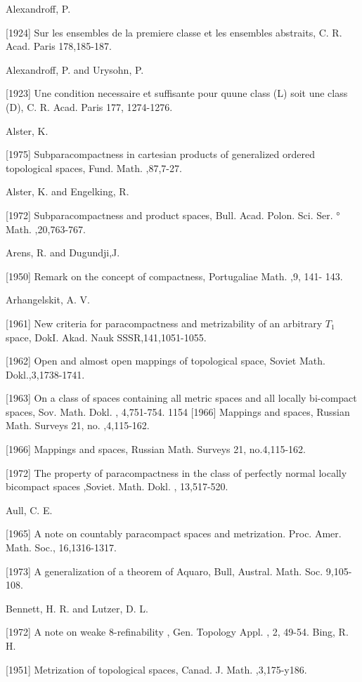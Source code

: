 \documentclass[main.tex]{subfiles}
\begin{document}
\noindent Alexandroff, P.

[1924] Sur les ensembles de la premiere classe et les ensembles abstraits, C.
R. Acad. Paris 178,185-187.

\noindent Alexandroff, P. and Urysohn, P.

[1923] Une condition necessaire et suffisante pour quune class (L) soit une class (D), C. R. Acad. Paris 177, 1274-1276.

\noindent Alster, K.

[1975] Subparacompactness in cartesian products of generalized ordered topological spaces, Fund. Math. ,87,7-27.

\noindent Alster, K. and Engelking, R.

[1972] Subparacompactness and product spaces, Bull. Acad. Polon. Sci. Ser.
° Math. ,20,763-767.

\noindent Arens, R. and Dugundji,J.

[1950] Remark on the concept of compactness, Portugaliae Math. ,9, 141- 143.

\noindent Arhangelskit, A. V.

[1961] New criteria for paracompactness and metrizability of an arbitrary $T_1$ space, DokI. Akad. Nauk SSSR,141,1051-1055.

[1962] Open and almost open mappings of topological space, Soviet Math. Dokl.,3,1738-1741.

[1963] On a class of spaces containing all metric spaces and all locally bi-compact spaces, Sov. Math. Dokl. , 4,751-754. 1154
[1966] Mappings and spaces, Russian Math. Surveys 21, no. ,4,115-162.

[1966] Mappings and spaces, Russian Math. Surveys 21, no.4,115-162.
	
[1972] The property of paracompactness in the class of perfectly normal locally bicompact spaces ,Soviet. Math. Dokl. , 13,517-520.

\noindent Aull, C. E.

[1965]
A note on countably paracompact spaces and metrization. Proc.
Amer. Math. Soc., 16,1316-1317.

[1973]
A generalization of a theorem of Aquaro, Bull, Austral. Math. Soc.
9,105-108.

\noindent Bennett, H. R. and Lutzer, D. L.

[1972] A note on weake 8-refinability , Gen. Topology Appl. , 2, 49-54.
Bing, R. H.

[1951] Metrization of topological spaces, Canad. J. Math. ,3,175-y186.
\end{document}
